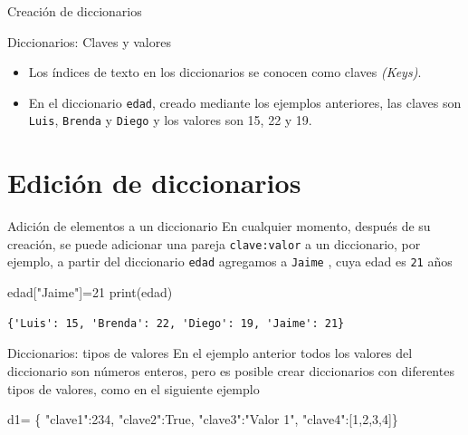 \documentclass[
  ignorenonframetext,
  aspectratio=169,
  spanish,
]{beamer}
\newenvironment{Shaded}{\begin{snugshade}}{\end{snugshade}}
\newcommand{\BuiltInTok}[1]{\textcolor[rgb]{0.00,0.23,0.31}{#1}}
\newcommand{\DecValTok}[1]{\textcolor[rgb]{0.68,0.00,0.00}{#1}}
\newcommand{\NormalTok}[1]{\textcolor[rgb]{0.00,0.23,0.31}{#1}}
\newcommand{\OperatorTok}[1]{\textcolor[rgb]{0.37,0.37,0.37}{#1}}
\newcommand{\StringTok}[1]{\textcolor[rgb]{0.13,0.47,0.30}{#1}}
\newcommand{\VariableTok}[1]{\textcolor[rgb]{0.07,0.07,0.07}{#1}}
\begin{document}
\begin{frame}[fragile]{Creación de diccionarios}
\begin{block}{Diccionarios: Claves y valores}
\label{diccionarios-claves-y-valores}
\begin{itemize}
\item
  Los índices de texto en los diccionarios se conocen como claves
  \emph{(Keys)}.
\item
  En el diccionario \texttt{edad}, creado mediante los ejemplos
  anteriores, las claves son
  \texttt{\textquotesingle{}Luis\textquotesingle{}},
  \texttt{\textquotesingle{}Brenda\textquotesingle{}} y
  \texttt{\textquotesingle{}Diego\textquotesingle{}} y los valores son
  15, 22 y 19.
\end{itemize}
\end{block}
\end{frame}

\section{Edición de diccionarios}\label{ediciuxf3n-de-diccionarios}

\begin{frame}[fragile]{Adición de elementos a un diccionario}
\label{adiciuxf3n-de-elementos-a-un-diccionario}
En cualquier momento, después de su creación, se puede adicionar una
pareja \texttt{clave:valor} a un diccionario, por ejemplo, a partir del
diccionario \texttt{edad} agregamos a \texttt{Jaime} , cuya edad es
\texttt{21} años

\begin{Shaded}
\begin{Highlighting}[]
\NormalTok{edad[}\StringTok{"Jaime"}\NormalTok{]}\OperatorTok{=}\DecValTok{21} 
\BuiltInTok{print}\NormalTok{(edad)}
\end{Highlighting}
\end{Shaded}

\begin{verbatim}
{'Luis': 15, 'Brenda': 22, 'Diego': 19, 'Jaime': 21}
\end{verbatim}
\end{frame}

\begin{frame}[fragile]{Diccionarios: tipos de valores}
\label{diccionarios-tipos-de-valores}
En el ejemplo anterior todos los valores del diccionario son números
enteros, pero es posible crear diccionarios con diferentes tipos de
valores, como en el siguiente ejemplo

\begin{Shaded}
\begin{Highlighting}[]
\NormalTok{d1}\OperatorTok{=}\NormalTok{ \{}
     \StringTok{"clave1"}\NormalTok{:}\DecValTok{234}\NormalTok{,}
     \StringTok{"clave2"}\NormalTok{:}\VariableTok{True}\NormalTok{,}
     \StringTok{"clave3"}\NormalTok{:}\StringTok{"Valor 1"}\NormalTok{,}
     \StringTok{"clave4"}\NormalTok{:[}\DecValTok{1}\NormalTok{,}\DecValTok{2}\NormalTok{,}\DecValTok{3}\NormalTok{,}\DecValTok{4}\NormalTok{]\}}
\end{Highlighting}
\end{Shaded}
\end{frame}
\end{document}
